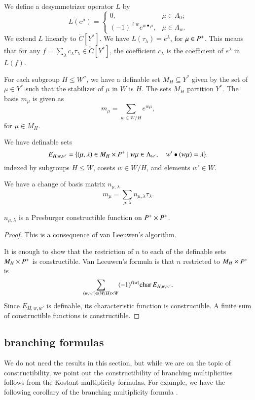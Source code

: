 We define a desymmetrizer operator $L$ by
\[
L(e^\mu) = \begin{cases}
0,& \mu\in \Lambda_0;\\
(-1)^{\ell{w}} e^{w\bullet \mu},& \mu\in\Lambda_w.
\end{cases}
\]
We extend $L$ linearly to $\ring{C}[Y^*]$.
We have $L(\tau_\lambda) = e^\lambda$, for $\mu\in P^+$.  This means that
for any $f = \sum_\lambda c_\lambda \tau_\lambda \in \ring{C}[Y^*]$, the coefficient $c_\lambda$
is the coefficient of $e^\lambda$ in $L(f)$.

For each subgroup $H\le W^\sigma$, we have a definable set
$M_H \subseteq Y^*$ given by the set of $\mu\in Y^*$ such that
the stabilizer of $\mu$ in $W$ is $H$.  
The sets $M_H$ partition $Y^*$. 
The basis $m_\mu$ is given
as 
\[
m_\mu = \sum_{w\in W/H} e^{w \mu},
\]
for $\mu\in M_H$.

We have definable sets 
\[
E_{H,w,w'} = \{(\mu,\lambda)\in M_H\times P^+ \mid w\mu\in\Lambda_{w'},\quad w'\bullet(w\mu)=\lambda\}.
\]
indexed by subgroups $H\le W$, cosets $w\in W/H$, and elements $w'\in W$.

We have a change of basis matrix $n_{\mu,\lambda}$ 
\[
m_\mu = \sum_{\mu,\lambda} n_{\mu,\lambda} \tau_\lambda.
\]

\begin{theorem}\label{lemma:van-leeuwen} $n_{\mu,\lambda}$ is a Presburger constructible function on $P^+\times P^+$.
\end{theorem}

\begin{proof} This is a consequence of van Leeuwen's algorithm. 

It is enough to show that the restriction of $n$ to each of the definable sets
$M_H\times P^+$ is constructible.  Van Leeuwen's formula is that $n$ restricted
to $M_H\times P^+$ is 
\[
\sum_{(w,w')\in (W/H)\times W} (-1)^{\ell(w)} {\operatorname{char}}\, E_{H,w,w'}.
\]
Since $E_{H,w,w'}$ is definable, its characteristic function is constructible.
A finite sum of constructible functions is constructible.
\end{proof}

\subsection{branching formulas}

We do not need the results in this section, but while we are on the topic of constructibility,
we point out the constructibility of branching multiplicities follows from the Kostant
multiplicity formulas.  For example, we have the following corollary of the branching
multiplicity formula \cite[Theorem ~8.2.1]{goodman}.

